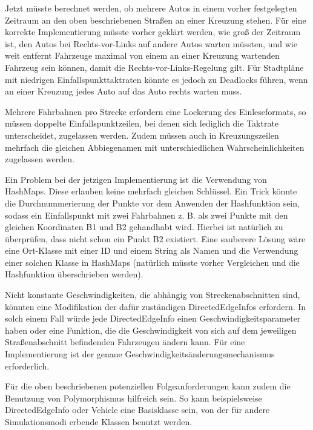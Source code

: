 Jetzt müsste berechnet werden, ob mehrere Autos in einem vorher festgelegten Zeitraum an den oben beschriebenen Straßen an einer Kreuzung stehen.
Für eine korrekte Implementierung müsste vorher geklärt werden, wie groß der Zeitraum ist, den Autos bei Rechts-vor-Links auf andere Autos warten müssten,
und wie weit entfernt Fahrzeuge maximal von einem an einer Kreuzung wartenden Fahrzeug sein können, damit die Rechts-vor-Links-Regelung gilt. 
Für Stadtpläne mit niedrigen Einfallspunkttaktraten könnte es jedoch zu Deadlocks führen, wenn an einer Kreuzung jedes Auto auf das Auto rechts warten muss.

Mehrere Fahrbahnen pro Strecke erfordern eine Lockerung des Einleseformats,
so müssen doppelte Einfallspunktzeilen, bei denen sich lediglich die Taktrate unterscheidet, zugelassen werden.
Zudem müssen auch in Kreuzungszeilen mehrfach die gleichen Abbiegenamen mit unterschiedlichen Wahrscheinlichkeiten zugelassen werden.

Ein Problem bei der jetzigen Implementierung ist die Verwendung von HashMaps. Diese erlauben keine mehrfach gleichen Schlüssel.
Ein Trick könnte die Durchnummerierung der Punkte vor dem Anwenden der Hashfunktion sein, sodass ein Einfallspunkt mit zwei
Fahrbahnen z. B. als zwei Punkte mit den gleichen Koordinaten B1 und B2 gehandhabt wird.
Hierbei ist natürlich zu überprüfen, dass nicht schon ein Punkt B2 existiert. Eine sauberere Lösung wäre eine Ort-Klasse mit einer ID und einem String als Namen und die Verwendung einer solchen
Klasse in HashMaps (natürlich müsste vorher Vergleichen und die Hashfunktion überschrieben werden).

Nicht konstante Geschwindigkeiten, die abhängig von Streckenabschnitten sind, könnten eine Modifikation der dafür zuständigen DirectedEdgeInfos erfordern.
In solch einem Fall würde jede DirectedEdgeInfo einen Geschwindigkeitsparameter haben oder eine Funktion, die die Geschwindigkeit von sich auf dem jeweiligen
Straßenabschnitt befindenden Fahrzeugen ändern kann.
Für eine Implementierung ist der genaue Geschwindigkeitsänderungsmechanismus erforderlich.

Für die oben beschriebenen potenziellen Folgeanforderungen kann zudem die Benutzung von Polymorphismus hilfreich sein.
So kann beispielsweise DirectedEdgeInfo oder Vehicle eine Basisklasse sein, von der für andere Simulationsmodi erbende Klassen benutzt werden.


